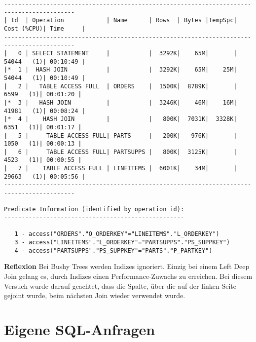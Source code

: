 \documentclass[10pt]{article}
\begin{document}
\begin{lstlisting}[style=queryexecutionplan]
------------------------------------------------------------------------------------------
| Id  | Operation            | Name      | Rows  | Bytes |TempSpc| Cost (%CPU)| Time     |
------------------------------------------------------------------------------------------
|   0 | SELECT STATEMENT     |           |  3292K|    65M|       | 54044   (1)| 00:10:49 |
|*  1 |  HASH JOIN           |           |  3292K|    65M|    25M| 54044   (1)| 00:10:49 |
|   2 |   TABLE ACCESS FULL  | ORDERS    |  1500K|  8789K|       |  6599   (1)| 00:01:20 |
|*  3 |   HASH JOIN          |           |  3246K|    46M|    16M| 41981   (1)| 00:08:24 |
|*  4 |    HASH JOIN         |           |   800K|  7031K|  3328K|  6351   (1)| 00:01:17 |
|   5 |     TABLE ACCESS FULL| PARTS     |   200K|   976K|       |  1050   (1)| 00:00:13 |
|   6 |     TABLE ACCESS FULL| PARTSUPPS |   800K|  3125K|       |  4523   (1)| 00:00:55 |
|   7 |    TABLE ACCESS FULL | LINEITEMS |  6001K|    34M|       | 29663   (1)| 00:05:56 |
------------------------------------------------------------------------------------------
 
Predicate Information (identified by operation id):
---------------------------------------------------
 
   1 - access("ORDERS"."O_ORDERKEY"="LINEITEMS"."L_ORDERKEY")
   3 - access("LINEITEMS"."L_ORDERKEY"="PARTSUPPS"."PS_SUPPKEY")
   4 - access("PARTSUPPS"."PS_SUPPKEY"="PARTS"."P_PARTKEY")
\end{lstlisting}
\textbf{Reflexion} \newline
Bei Bushy Trees werden Indizes ignoriert. Einzig bei einem Left Deep Join gelang es, durch Indizes einen Performance-Zuwachs zu erreichen.
Bei diesem Versuch wurde darauf geachtet, dass die Spalte, über die auf der linken Seite gejoint wurde, beim nächsten Join wieder verwendet wurde.

\section{Eigene SQL-Anfragen}

\end{document}
